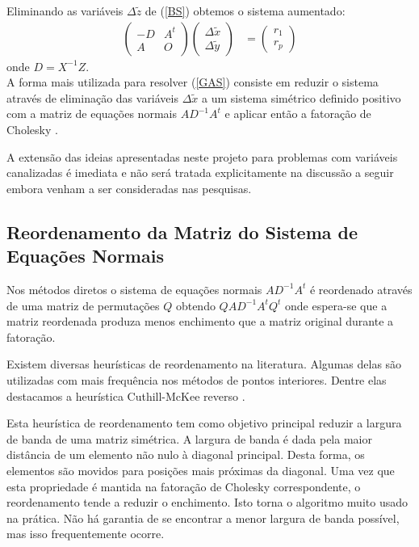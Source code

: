 \documentclass[12pt]{article}
\begin{document}
Eliminando as variáveis $\Delta \tilde{z}$ de (\ref{BS}) obtemos o sistema
aumentado:
\begin{eqnarray} \label{GAS}
\left(\begin{array}{rc}
-D & A^t\\
 A & O
\end{array} \right)
\left(\begin{array}{r}
\Delta \tilde{x}\\
\Delta \tilde{y}
\end{array} \right) &=
\left(\begin{array}{c}
r_1\\
r_p
\end{array} \right)
\end{eqnarray}
onde $D = X^{-1}Z$.\\

A forma mais utilizada para resolver (\ref{GAS}) consiste em reduzir o
sistema através de eliminação das variáveis $\Delta \tilde{x}$ a um sistema
simétrico definido positivo com a matriz de equações normais
$AD^{-1}A^t$ e aplicar então a fatoração de Cholesky
\cite{ARVK89,CMWW96,Go96}.

A extensão das ideias apresentadas neste projeto para problemas com
variáveis canalizadas é imediata e não será tratada explicitamente na
discussão a seguir embora venham a ser consideradas nas pesquisas.

\subsection{Reordenamento da Matriz do Sistema de Equações Normais}
Nos métodos diretos o sistema de equações normais
$AD^{-1}A^t$ é reordenado através de uma matriz de
permutações $Q$ obtendo $QAD^{-1}A^tQ^t$ onde espera-se
que a matriz reordenada produza menos enchimento que a
matriz original durante a fatoração.

Existem diversas heurísticas de reordenamento na literatura.
Algumas delas são utilizadas com mais frequência nos métodos
de pontos interiores. Dentre elas destacamos a heurística
Cuthill-McKee reverso \cite{CM69}.

Esta heurística de reordenamento tem como objetivo principal reduzir a largura
de banda de uma matriz simétrica. A largura de banda é dada pela maior distância
de um elemento não nulo à diagonal principal. Desta forma, os elementos são
movidos para posições mais próximas da diagonal.  Uma vez que esta propriedade é
mantida na fatoração de Cholesky correspondente, o reordenamento tende a reduzir
o enchimento.  Isto torna o algoritmo muito usado na prática. Não há garantia de
se encontrar a menor largura de banda possível, mas isso frequentemente ocorre.
\end{document}
